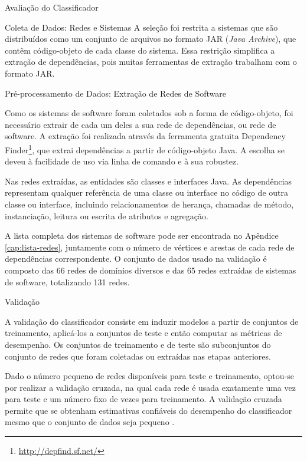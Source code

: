 \begin{section}{Avaliação do Classificador}
\begin{subsection}{Coleta de Dados: Redes e Sistemas}
			A seleção foi restrita a sistemas que são distribuídos como um conjunto de arquivos no formato JAR (\emph{Java Archive}), que contêm código-objeto de cada classe do sistema. Essa restrição simplifica a extração de dependências, pois muitas ferramentas de extração trabalham com o formato JAR.

\end{subsection}

\begin{subsection}{Pré-processamento de Dados: Extração de Redes de Software}

	Como os sistemas de software foram coletados sob a forma de código-objeto, foi necessário extrair de cada um deles a sua rede de dependências, ou rede de software. A extração foi realizada através da ferramenta gratuita Dependency Finder\footnote{\url{http://depfind.sf.net/}}, que extrai dependências a partir de código-objeto Java. A escolha se deveu à facilidade de uso via linha de comando e à sua robustez.

	Nas redes extraídas, as entidades são classes e interfaces Java. As dependências representam qualquer referência de uma classe ou interface no código de outra classe ou interface, incluindo relacionamentos de herança, chamadas de método, instanciação, leitura ou escrita de atributos e agregação.

	A lista completa dos sistemas de software pode ser encontrada no Apêndice \ref{cap:lista-redes}, juntamente com o número de vértices e arestas de cada rede de dependências correspondente. O conjunto de dados usado na validação é composto das 66 redes de domínios diversos e das 65 redes extraídas de sistemas de software, totalizando 131 redes. 

\end{subsection}

\begin{subsection}{Validação}

	A validação do classificador consiste em induzir modelos a partir de conjuntos de treinamento, aplicá-los a conjuntos de teste e então computar as métricas de desempenho. Os conjuntos de treinamento e de teste são subconjuntos do conjunto de redes que foram coletadas ou extraídas nas etapas anteriores.
	
	Dado o número pequeno de redes disponíveis para teste e treinamento, optou-se por realizar a validação cruzada, na qual cada rede é usada exatamente uma vez para teste e um número fixo de vezes para treinamento. A validação cruzada permite que se obtenham estimativas confiáveis do desempenho do classificador mesmo que o conjunto de dados seja pequeno \cite{Witten2005}.
	

\end{subsection}
\end{section}
